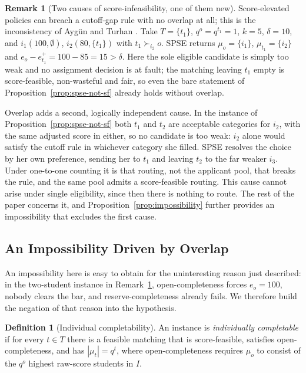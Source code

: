 \documentclass[a4paper,twoside]{article}
\theoremstyle{definition}
\newtheorem{definition}{Definition}
\newtheorem{nremark}{Remark}
\begin{document}
\begin{nremark}[Two causes of score-infeasibility, one of them new]
\label{rem:overlap-cause}
Score-elevated policies can breach a cutoff-gap rule with no overlap at all; this is the inconsistency of Ayg\"un and Turhan \cite{AyTu23b}. Take $T=\{t_1\}$, $q^o=q^{t_1}=1$, $k=5$, $\delta=10$, and $i_1(100,\emptyset)$, $i_2(80,\{t_1\})$ with $t_1\succ_{i_2}o$. SPSE returns $\mu_o=\{i_1\}$, $\mu_{t_1}=\{i_2\}$ and $e_o-e_{t_1}^+=100-85=15>\delta$. Here the sole eligible candidate is simply too weak and no assignment decision is at fault; the matching leaving $t_1$ empty is score-feasible, non-wasteful and fair, so even the bare statement of Proposition~\ref{prop:spse-not-sf} already holds without overlap.

Overlap adds a second, logically independent cause. In the instance of Proposition~\ref{prop:spse-not-sf} both $t_1$ and $t_2$ are acceptable categories for $i_2$, with the same adjusted score in either, so no candidate is too weak: $i_2$ alone would satisfy the cutoff rule in whichever category she filled. SPSE resolves the choice by her own preference, sending her to $t_1$ and leaving $t_2$ to the far weaker $i_3$. Under one-to-one counting it is that routing, not the applicant pool, that breaks the rule, and the same pool admits a score-feasible routing. This cause cannot arise under single eligibility, since then there is nothing to route. The rest of the paper concerns it, and Proposition~\ref{prop:impossibility} further provides an impossibility that excludes the first cause.
\end{nremark}

\subsection{An Impossibility Driven by Overlap}

An impossibility here is easy to obtain for the uninteresting reason just described: in the two-student instance in Remark~\ref{rem:overlap-cause}, open-completeness forces $e_o=100$, nobody clears the bar, and reserve-completeness already fails. We therefore build the negation of that reason into the hypothesis.

\begin{definition}[Individual completability]
\label{def:indcomp}
An instance is \emph{individually completable} if for every $t\in T$ there is a feasible matching that is score-feasible, satisfies open-completeness, and has $|\mu_t|=q^t$, where open-completeness requires $\mu_o$ to consist of the $q^o$ highest raw-score students in $I$.
\end{definition}
\end{document}
